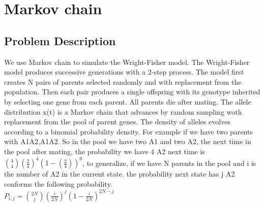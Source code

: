 \documentclass[twoside]{article}
\begin{document}
\section{Markov chain}
\subsection{\normalsize{Problem Description}}
We use Markov chain to simulate the Wright-Fisher model. The Wright-Fisher model produces successive generations with a 2-step process. The model first creates N pairs of parents selected randomly and with replacement from the population. Then each pair produces a single offspring with its genotype inherited by selecting one gene from each parent. All parents die after mating. The allele distribution x(t) is a Markov chain that advances by random sampling woth replacement from the pool of parent genes. The density of alleles evolves according to a binomial probability density. For example if we have two parents with A1A2,A1A2. So in the pool we have two A1 and two A2, the next time in the pool after mating, the probability we have 4 A2 next time is ${4 \choose 4}(\frac{2}{4})^4(1- (\frac{2}{4}))^0$, to generalize, if we have N parents in the pool and i is the number of A2 in the current state. the probability next state has j A2 conforms the following probability. \\
$P_{i,j} = {2N \choose j}(\frac{i}{2N})^j(1-\frac{i}{2N})^{2N-j}$
\end{document}
